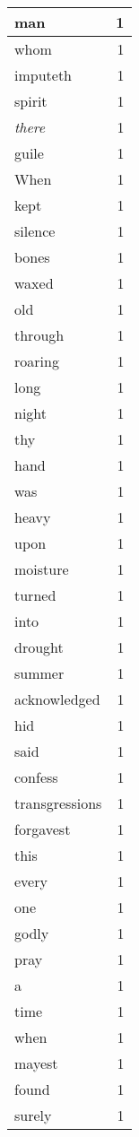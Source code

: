 \begin{center}
\begin{longtable}{l|r}
man & 1 \\ \hline
whom & 1 \\ \hline
imputeth & 1 \\ \hline
spirit & 1 \\ \hline
\emph{there} & 1 \\ \hline
guile & 1 \\ \hline
When & 1 \\ \hline
kept & 1 \\ \hline
silence & 1 \\ \hline
bones & 1 \\ \hline
waxed & 1 \\ \hline
old & 1 \\ \hline
through & 1 \\ \hline
roaring & 1 \\ \hline
long & 1 \\ \hline
night & 1 \\ \hline
thy & 1 \\ \hline
hand & 1 \\ \hline
was & 1 \\ \hline
heavy & 1 \\ \hline
upon & 1 \\ \hline
moisture & 1 \\ \hline
turned & 1 \\ \hline
into & 1 \\ \hline
drought & 1 \\ \hline
summer & 1 \\ \hline
acknowledged & 1 \\ \hline
hid & 1 \\ \hline
said & 1 \\ \hline
confess & 1 \\ \hline
transgressions & 1 \\ \hline
forgavest & 1 \\ \hline
this & 1 \\ \hline
every & 1 \\ \hline
one & 1 \\ \hline
godly & 1 \\ \hline
pray & 1 \\ \hline
a & 1 \\ \hline
time & 1 \\ \hline
when & 1 \\ \hline
mayest & 1 \\ \hline
found & 1 \\ \hline
surely & 1 \\ \hline

\end{longtable}
\end{center}
